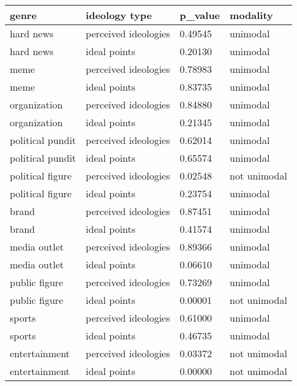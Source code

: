 \begin{table}
\centering
\begin{tabular}[t]{llll}
\toprule
genre & ideology type & p\_value & modality\\
\midrule
hard news & perceived ideologies & 0.49545 & unimodal\\
hard news & ideal points & 0.20130 & unimodal\\
meme & perceived ideologies & 0.78983 & unimodal\\
meme & ideal points & 0.83735 & unimodal\\
organization & perceived ideologies & 0.84880 & unimodal\\
organization & ideal points & 0.21345 & unimodal\\
political pundit & perceived ideologies & 0.62014 & unimodal\\
political pundit & ideal points & 0.65574 & unimodal\\
political figure & perceived ideologies & 0.02548 & not unimodal\\
political figure & ideal points & 0.23754 & unimodal\\
brand & perceived ideologies & 0.87451 & unimodal\\
brand & ideal points & 0.41574 & unimodal\\
media outlet & perceived ideologies & 0.89366 & unimodal\\
media outlet & ideal points & 0.06610 & unimodal\\
public figure & perceived ideologies & 0.73269 & unimodal\\
public figure & ideal points & 0.00001 & not unimodal\\
sports & perceived ideologies & 0.61000 & unimodal\\
sports & ideal points & 0.46735 & unimodal\\
entertainment & perceived ideologies & 0.03372 & not unimodal\\
entertainment & ideal points & 0.00000 & not unimodal\\
\bottomrule
\end{tabular}
\end{table}
